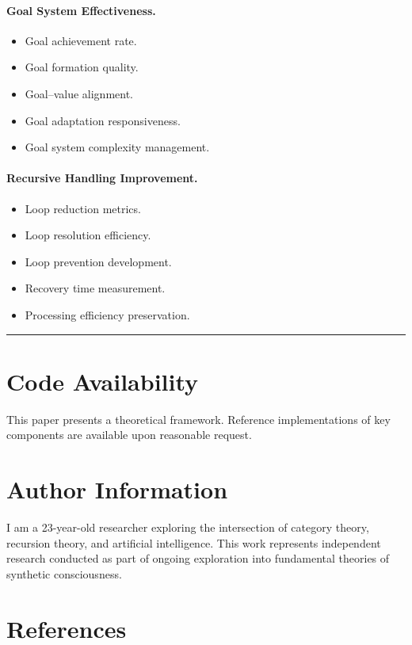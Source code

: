 \documentclass[12pt]{article}
\begin{document}
\paragraph{Goal System Effectiveness.}
\begin{itemize}
\item Goal achievement rate.
\item Goal formation quality.
\item Goal--value alignment.
\item Goal adaptation responsiveness.
\item Goal system complexity management.
\end{itemize}

\paragraph{Recursive Handling Improvement.}
\begin{itemize}
\item Loop reduction metrics.
\item Loop resolution efficiency.
\item Loop prevention development.
\item Recovery time measurement.
\item Processing efficiency preservation.
\end{itemize}

\begin{center}\rule{0.5\linewidth}{0.5pt}\end{center}

\section*{Code Availability}
This paper presents a theoretical framework. Reference implementations of key components are available upon reasonable request.

\section*{Author Information}
I am a 23-year-old researcher exploring the intersection of category theory, recursion theory, and artificial intelligence. This work represents independent research conducted as part of ongoing exploration into fundamental theories of synthetic consciousness.

\section{References}\label{references}
\end{document}
